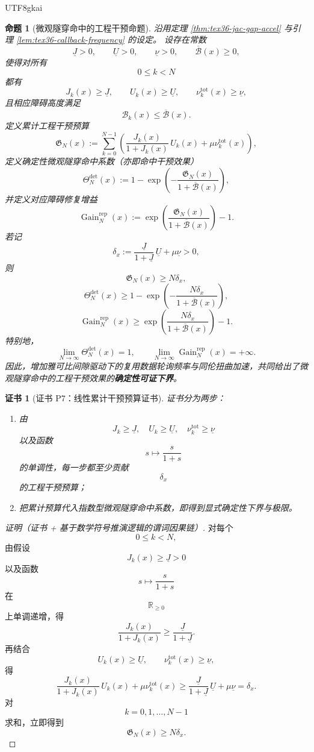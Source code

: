 \documentclass[12pt]{article}
\newtheorem{proposition}{命题}[section]
\newtheorem{Certificate}{证书}[section]
\newcommand{\RR}{\mathbb{R}}
\begin{document}
\begin{CJK*}{UTF8}{gkai}
\begin{proposition}[微观隧穿命中的工程干预命题]
\label{prop:tex36-deterministic-tunneling-gain}
沿用定理 \ref{thm:tex36-jac-gap-accel} 与引理 \ref{lem:tex36-callback-frequency} 的设定。
设存在常数
\[
  \underline J>0,
  \qquad
  \underline U>0,
  \qquad
  \underline \nu>0,
  \qquad
  \overline{\mathcal B}(x)\ge 0,
\]
使得对所有
\[
  0\le k<N
\]
都有
\[
  J_k(x)\ge \underline J,
  \qquad
  U_k(x)\ge \underline U,
  \qquad
  \nu_k^{\mathrm{tot}}(x)\ge \underline \nu,
\]
且相应障碍高度满足
\[
  \mathcal B_k(x)\le \overline{\mathcal B}(x).
\]
定义累计工程干预预算
\[
  \mathfrak G_N(x)
  :=
  \sum_{k=0}^{N-1}
  \left(
    \frac{J_k(x)}{1+J_k(x)}\,U_k(x)
    +
    \mu \nu_k^{\mathrm{tot}}(x)
  \right),
\]
定义确定性微观隧穿命中系数（亦即命中干预效果）
\[
  \Theta_N^{\mathrm{det}}(x)
  :=
  1-\exp\left(
    -\frac{\mathfrak G_N(x)}{1+\overline{\mathcal B}(x)}
  \right),
\]
并定义对应障碍修复增益
\[
  \operatorname{Gain}_N^{\mathrm{rep}}(x)
  :=
  \exp\left(
    \frac{\mathfrak G_N(x)}{1+\overline{\mathcal B}(x)}
  \right)-1.
\]
若记
\[
  \delta_x
  :=
  \frac{\underline J}{1+\underline J}\,\underline U
  +
  \mu \underline \nu
  >0,
\]
则
\[
  \mathfrak G_N(x)\ge N\delta_x,
\]
\[
  \Theta_N^{\mathrm{det}}(x)
  \ge
  1-\exp\left(
    -\frac{N\delta_x}{1+\overline{\mathcal B}(x)}
  \right),
\]
\[
  \operatorname{Gain}_N^{\mathrm{rep}}(x)
  \ge
  \exp\left(
    \frac{N\delta_x}{1+\overline{\mathcal B}(x)}
  \right)-1.
\]
特别地，
\[
  \lim_{N\to\infty}\Theta_N^{\mathrm{det}}(x)=1,
  \qquad
  \lim_{N\to\infty}\operatorname{Gain}_N^{\mathrm{rep}}(x)=+\infty.
\]
因此，增加雅可比间隙驱动下的复用数据轮询频率与同伦扭曲加速，共同给出了微观隧穿命中的工程干预效果的\textbf{确定性可证下界}。
\end{proposition}

\begin{Certificate}[证书 P7：线性累计干预预算证书]
\label{cert:tex36-p7}
证书分为两步：
\begin{enumerate}
  \item 由
  \[
    J_k\ge \underline J,\quad
    U_k\ge \underline U,\quad
    \nu_k^{\mathrm{tot}}\ge \underline \nu
  \]
  以及函数
  \[
    s\mapsto \frac{s}{1+s}
  \]
  的单调性，每一步都至少贡献
  \[
    \delta_x
  \]
  的工程干预预算；
  \item 把累计预算代入指数型微观隧穿命中系数，即得到显式确定性下界与极限。
\end{enumerate}
\end{Certificate}

\begin{proof}[证明（证书 + 基于数学符号推演逻辑的谓词因果链）]
对每个
\[
  0\le k<N,
\]
由假设
\[
  J_k(x)\ge \underline J>0
\]
以及函数
\[
  s\mapsto \frac{s}{1+s}
\]
在
\[
  \RR_{\ge 0}
\]
上单调递增，得
\[
  \frac{J_k(x)}{1+J_k(x)}
  \ge
  \frac{\underline J}{1+\underline J}.
\]
再结合
\[
  U_k(x)\ge \underline U,
  \qquad
  \nu_k^{\mathrm{tot}}(x)\ge \underline \nu,
\]
得
\[
  \frac{J_k(x)}{1+J_k(x)}\,U_k(x)
  +
  \mu \nu_k^{\mathrm{tot}}(x)
  \ge
  \frac{\underline J}{1+\underline J}\,\underline U
  +
  \mu \underline \nu
  =
  \delta_x.
\]
对
\[
  k=0,1,\ldots,N-1
\]
求和，立即得到
\[
  \mathfrak G_N(x)\ge N\delta_x.
\]


\end{proof}
\end{CJK*}
\end{document}
